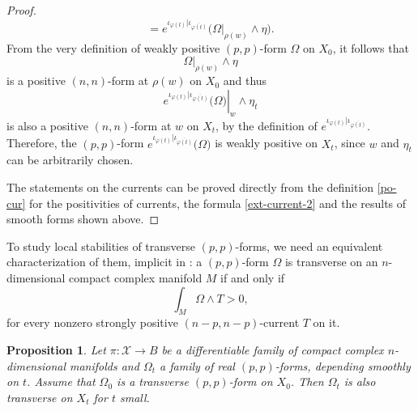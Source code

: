 \documentclass[12pt]{amsart}
\numberwithin{equation}{section}
\newtheorem{proposition}[theorem]{Proposition}
\renewcommand{\1}{\mathds{1}}
\renewcommand{\>}{\rightarrow}
\begin{document}
\begin{proof}
\[= e^{\iota_{\varphi(t)}|\iota_{\overline{\varphi(t)}}} \big( \left.\Omega\right|_{\rho(w)} \wedge \eta \big).\]
From the very definition of weakly positive $(p,p)$-form $\Omega$ on $X_0$, it follows that \[\left.\Omega\right|_{\rho(w)} \wedge \eta\]
is a positive $(n,n)$-form at $\rho(w)$ on $X_0$ and thus
\[\left.e^{\iota_{\varphi(t)}|\iota_{\overline{\varphi(t)}}} \big( \Omega \big)\right|_{w} \wedge \eta_t\]
is also a positive $(n,n)$-form at $w$ on $X_t$, by the definition of $e^{\iota_{\varphi(t)}|\iota_{\overline{\varphi(t)}}}$. Therefore,
the $(p,p)$-form $e^{\iota_{\varphi(t)}|\iota_{\overline{\varphi(t)}}} \big( \Omega \big)$ is weakly positive on $X_t$, since $w$ and $\eta_t$
can be arbitrarily chosen.

The statements on the currents can be proved directly from the definition \ref{po-cur} for the positivities of currents, the formula \eqref{ext-current-2} and the results
of smooth forms shown above.
\end{proof}


To study local stabilities of transverse $(p,p)$-forms, we need an equivalent characterization of them, implicit in
\cite[The proofs of Lemma 1.22 and Theorem 1.17]{aa}: a $(p,p)$-form
$\Omega$ is transverse on an $n$-dimensional  compact complex manifold $M$
if and only if \[\int_M \Omega \wedge T>0,\]
for every nonzero strongly positive $(n-p,n-p)$-current $T$ on it.

\begin{proposition}\label{ext-trans}
Let $\pi: \mathcal{X} \> B$ be a  differentiable family of compact complex $n$-dimensional manifolds and
$\Omega_t$  a family of real $(p,p)$-forms, depending smoothly on $t$. Assume that
$\Omega_0$ is a transverse $(p,p)$-form on $X_0$. Then $\Omega_t$ is also transverse on $X_t$ for $t$ small.
\end{proposition}
\end{document}
